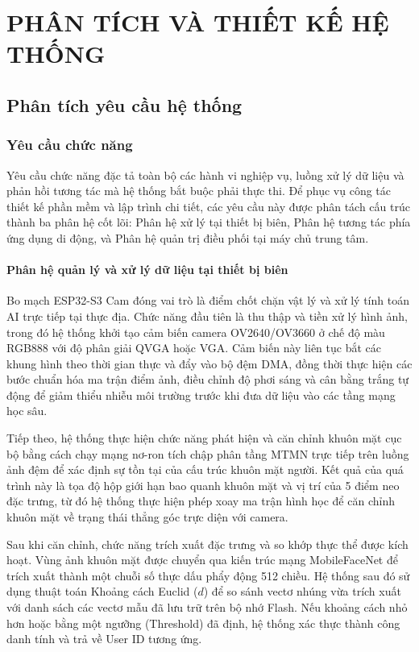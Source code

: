 \chapter{PHÂN TÍCH VÀ THIẾT KẾ HỆ THỐNG}

\section{Phân tích yêu cầu hệ thống}
\subsection{Yêu cầu chức năng}
Yêu cầu chức năng đặc tả toàn bộ các hành vi nghiệp vụ, luồng xử lý dữ liệu và phản hồi tương tác mà hệ thống bắt buộc phải thực thi. Để phục vụ công tác thiết kế phần mềm và lập trình chi tiết, các yêu cầu này được phân tách cấu trúc thành ba phân hệ cốt lõi: Phân hệ xử lý tại thiết bị biên, Phân hệ tương tác phía ứng dụng di động, và Phân hệ quản trị điều phối tại máy chủ trung tâm.

\subsubsection{Phân hệ quản lý và xử lý dữ liệu tại thiết bị biên}
Bo mạch ESP32-S3 Cam đóng vai trò là điểm chốt chặn vật lý và xử lý tính toán AI trực tiếp tại thực địa. Chức năng đầu tiên là thu thập và tiền xử lý hình ảnh, trong đó hệ thống khởi tạo cảm biến camera OV2640/OV3660 ở chế độ màu RGB888 với độ phân giải QVGA hoặc VGA. Cảm biến này liên tục bắt các khung hình theo thời gian thực và đẩy vào bộ đệm DMA, đồng thời thực hiện các bước chuẩn hóa ma trận điểm ảnh, điều chỉnh độ phơi sáng và cân bằng trắng tự động để giảm thiểu nhiễu môi trường trước khi đưa dữ liệu vào các tầng mạng học sâu.

Tiếp theo, hệ thống thực hiện chức năng phát hiện và căn chỉnh khuôn mặt cục bộ bằng cách chạy mạng nơ-ron tích chập phân tầng MTMN trực tiếp trên luồng ảnh đệm để xác định sự tồn tại của cấu trúc khuôn mặt người. Kết quả của quá trình này là tọa độ hộp giới hạn bao quanh khuôn mặt và vị trí của 5 điểm neo đặc trưng, từ đó hệ thống thực hiện phép xoay ma trận hình học để căn chỉnh khuôn mặt về trạng thái thẳng góc trực diện với camera.

Sau khi căn chỉnh, chức năng trích xuất đặc trưng và so khớp thực thể được kích hoạt. Vùng ảnh khuôn mặt được chuyển qua kiến trúc mạng MobileFaceNet để trích xuất thành một chuỗi số thực dấu phẩy động 512 chiều. Hệ thống sau đó sử dụng thuật toán Khoảng cách Euclid ($d$) để so sánh vectơ nhúng vừa trích xuất với danh sách các vectơ mẫu đã lưu trữ trên bộ nhớ Flash. Nếu khoảng cách nhỏ hơn hoặc bằng một ngưỡng (Threshold) đã định, hệ thống xác thực thành công danh tính và trả về User ID tương ứng.

